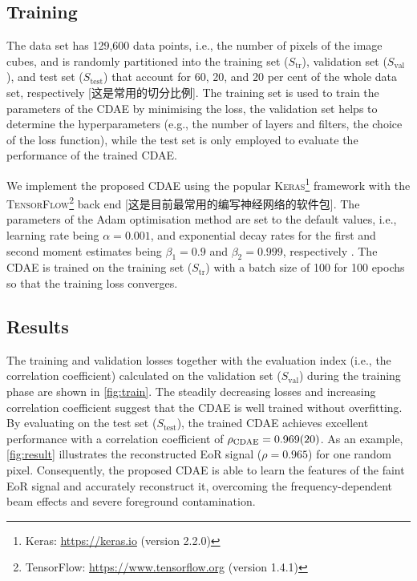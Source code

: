 \documentclass[letters,fleqn,usenatbib,onecolumn]{mnras}
\newcommand{\R}[1]{\mathrm{#1}}
\begin{document}
\subsection{Training}
\label{sec:training}

The data set has 129,600 data points, i.e., the number of pixels of
the image cubes, and is randomly partitioned into the
training set ($S_{\R{tr}}$), validation set ($S_{\R{val}}$), and
test set ($S_{\R{test}}$) that account for 60, 20, and 20 per cent of
the whole data set, respectively [这是常用的切分比例].
The training set is used to train the parameters of the CDAE by
minimising the loss,
the validation set helps to determine the hyperparameters (e.g., the
number of layers and filters, the choice of the loss function),
while the test set is only employed to evaluate the performance of the
trained CDAE.

We implement the proposed CDAE using the popular \textsc{Keras}\footnote{%
  Keras: \url{https://keras.io} (version 2.2.0)}
framework \citep{keras} with the \textsc{TensorFlow}\footnote{%
TensorFlow: \url{https://www.tensorflow.org} (version 1.4.1)}
back end \citep{tensorflow} [这是目前最常用的编写神经网络的软件包].
The parameters of the Adam optimisation method are set to the default
values, i.e., learning rate being $\alpha = 0.001$, and
exponential decay rates for the first and second moment estimates being
$\beta_1 = 0.9$ and $\beta_2 = 0.999$, respectively \citep{kingma2015}.
The CDAE is trained on the training set ($S_{\R{tr}}$) with a batch size
of 100 for 100 epochs so that the training loss converges.


\subsection{Results}
\label{sec:results}

The training and validation losses together with the evaluation index
(i.e., the correlation coefficient) calculated on the validation set
($S_{\R{val}}$) during the training phase are shown in \autoref{fig:train}.
The steadily decreasing losses and increasing correlation coefficient
suggest that the CDAE is well trained without overfitting.
By evaluating on the test set ($S_{\R{test}}$), the trained CDAE
achieves excellent performance with a correlation coefficient of
$\rho_{\R{CDAE}} = \num{0.969 +- 0.020}$.
As an example, \autoref{fig:result} illustrates the reconstructed EoR
signal ($\rho = 0.965$) for one random pixel.
Consequently, the proposed CDAE is able to learn the features of the
faint EoR signal and accurately reconstruct it, overcoming the
frequency-dependent beam effects and severe foreground contamination.
\end{document}

